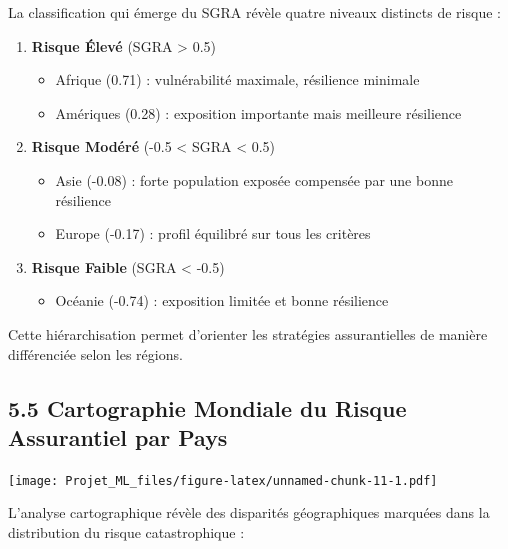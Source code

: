 \documentclass[
]{article}
\providecommand{\tightlist}{%
  \setlength{\itemsep}{0pt}\setlength{\parskip}{0pt}}
\begin{document}
La classification qui émerge du SGRA révèle quatre niveaux distincts de
risque :

\begin{enumerate}
\def\labelenumi{\arabic{enumi}.}
\tightlist
\item
  \textbf{Risque Élevé} (SGRA \textgreater{} 0.5)

  \begin{itemize}
  \tightlist
  \item
    Afrique (0.71) : vulnérabilité maximale, résilience minimale
  \item
    Amériques (0.28) : exposition importante mais meilleure résilience
  \end{itemize}
\item
  \textbf{Risque Modéré} (-0.5 \textless{} SGRA \textless{} 0.5)

  \begin{itemize}
  \tightlist
  \item
    Asie (-0.08) : forte population exposée compensée par une bonne
    résilience
  \item
    Europe (-0.17) : profil équilibré sur tous les critères
  \end{itemize}
\item
  \textbf{Risque Faible} (SGRA \textless{} -0.5)

  \begin{itemize}
  \tightlist
  \item
    Océanie (-0.74) : exposition limitée et bonne résilience
  \end{itemize}
\end{enumerate}

Cette hiérarchisation permet d'orienter les stratégies assurantielles de
manière différenciée selon les régions.

\subsection{5.5 Cartographie Mondiale du Risque Assurantiel par
Pays}\label{cartographie-mondiale-du-risque-assurantiel-par-pays}

\texttt{[image: Projet\_ML\_files/figure-latex/unnamed-chunk-11-1.pdf]}

L'analyse cartographique révèle des disparités géographiques marquées
dans la distribution du risque catastrophique :
\end{document}
